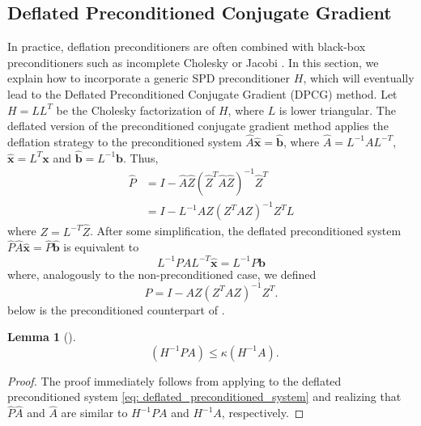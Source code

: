 \documentclass{article}
\numberwithin{equation}{section}
\DeclareMathOperator{\keff}{\kappa_{\operatorname{eff}}}
\theoremstyle{definition}
\newtheorem{lemma}[definition]{Lemma}
\begin{document}
\subsection{Deflated Preconditioned Conjugate Gradient}
\label{se: dpcg}
In practice, deflation preconditioners are often combined with black-box preconditioners such as incomplete Cholesky or Jacobi \cite{vuik1999efficient,tang2008two}. In this section, we explain how to incorporate a generic SPD preconditioner $H$, which will eventually lead to the Deflated Preconditioned Conjugate Gradient (DPCG) method. Let $H=LL^T$ be the Cholesky factorization of $H$, where $L$ is lower triangular. The deflated version of the preconditioned conjugate gradient method applies the deflation strategy to the preconditioned system $\hat{A}\hat{\bm{x}}=\hat{\bm{b}}$, where $\hat{A}=L^{-1}AL^{-T}$, $\hat{\bm{x}}=L^T\bm{x}$ and $\hat{\bm{b}}=L^{-1}\bm{b}$. Thus,
\begin{align*}
    \hat{P} &= I - \hat{A}\hat{Z}(\hat{Z}^T\hat{A}\hat{Z})^{-1}\hat{Z}^T \\
      &= I - L^{-1}AZ(Z^TAZ)^{-1}Z^TL
\end{align*}
where $Z=L^{-T}\hat{Z}$. After some simplification, the deflated preconditioned system $\hat{P}\hat{A}\hat{\bm{x}}=\hat{P}\hat{\bm{b}}$ is equivalent to
\begin{equation}
\label{eq: deflated_preconditioned_system}
    L^{-1}PAL^{-T}\hat{\bm{x}}=L^{-1}P\bm{b}
\end{equation}
where, analogously to the non-preconditioned case, we defined
\begin{equation*}
    P = I - AZ(Z^TAZ)^{-1}Z^T.
\end{equation*}
 below is the preconditioned counterpart of .

\begin{lemma}[{\cite[Theorem 2.2]{vuik2005deflation}}]
\label{lem: cond_defl_prec}
\begin{equation*}
    \keff(H^{-1}PA) \leq \kappa(H^{-1}A).
\end{equation*}  
\end{lemma}
\begin{proof}
The proof immediately follows from applying  to the deflated preconditioned system \eqref{eq: deflated_preconditioned_system} and realizing that $\hat{P}\hat{A}$ and $\hat{A}$ are similar to $H^{-1}PA$ and $H^{-1}A$, respectively.    
\end{proof}
\end{document}

